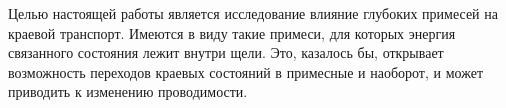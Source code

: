     Целью настоящей работы является исследование влияние глубоких примесей на краевой 
    транспорт. Имеются в виду такие примеси, для которых энергия связанного состояния
    лежит внутри щели. Это, казалось бы, открывает возможность переходов краевых
    состояний в примесные и наоборот, и может приводить к изменению проводимости.
    

    

    


    

